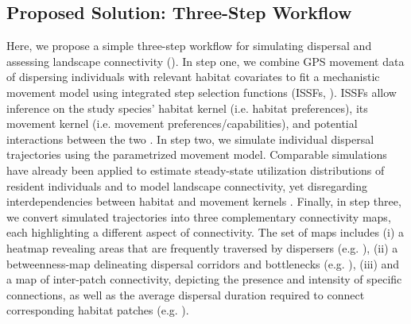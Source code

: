 \documentclass[abstract=on,10pt,a4paper,bibliography=totocnumbered]{article}
\begin{document}
\subsection{Proposed Solution: Three-Step Workflow}
Here, we propose a simple three-step workflow for simulating dispersal and
assessing landscape connectivity (). In step one, we
combine GPS movement data of dispersing individuals with relevant habitat
covariates to fit a mechanistic movement model using integrated step selection
functions (ISSFs, \citealp{Avgar.2016}). ISSFs allow inference on the study
species' habitat kernel (i.e. habitat preferences), its movement kernel (i.e.
movement preferences/capabilities), and potential interactions between the two
\citep{Avgar.2016, Fieberg.2021}. In step two, we simulate individual dispersal
trajectories using the parametrized movement model. Comparable simulations have
already been applied to estimate steady-state utilization distributions of
resident individuals \citep{Potts.2013, Signer.2017} and to model landscape
connectivity, yet disregarding interdependencies between habitat and movement
kernels \citep{Clark.2015, Zeller.2020}. Finally, in step three, we convert
simulated trajectories into three complementary connectivity maps, each
highlighting a different aspect of connectivity. The set of maps includes (i) a
heatmap revealing areas that are frequently traversed by dispersers (e.g.
\citealp{Hauenstein.2019, Zeller.2020}), (ii) a betweenness-map delineating
dispersal corridors and bottlenecks (e.g. \citealp{BastilleRousseau.2018}),
(iii) and a map of inter-patch connectivity, depicting the presence and
intensity of specific connections, as well as the average dispersal duration
required to connect corresponding habitat patches (e.g. \citealp{Gustafson.1996,
Kanagaraj.2013}).

\end{document}
